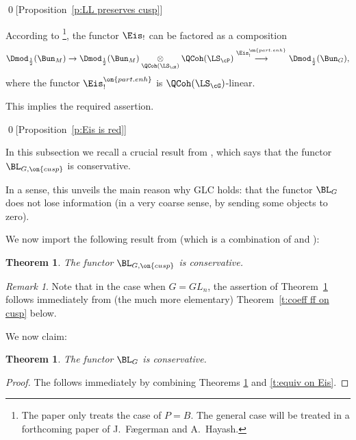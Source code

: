 \documentclass[9pt]{amsart}
\newtheorem{thm}[subsubsection]{Theorem}
\theoremstyle{remark}
\newtheorem{rem}[subsubsection]{Remark}
\theoremstyle{definition}
\theoremstyle{remark}
\newcommand{\thmref}[1]{Theorem~\ref{#1}}
\newcommand{\propref}[1]{Proposition~\ref{#1}}
\numberwithin{equation}{section}
\begin{document}
\qed[\propref{p:LL preserves cusp}] 


\sssec{Proof of \propref{p:Eis is red}} \label{sss:Eis is red} 

According to \cite{BG}\footnote{The paper \cite{BG} only treats the case of $P=B$. The general case will be treated
in a forthcoming paper of J.~F\ae{}german and A.~Hayash.}, the functor $\Eis_!$ can be factored as a composition
$$\Dmod_{\frac{1}{2}}(\Bun_M)\to
\Dmod_{\frac{1}{2}}(\Bun_M)\underset{\QCoh(\LS_\cM)}\otimes \QCoh(\LS_\cP) \overset{\Eis_!^{\on{part.enh}}}\longrightarrow 
\Dmod_{\frac{1}{2}}(\Bun_G),$$
where the functor $\Eis_!^{\on{part.enh}}$ is $\QCoh(\LS_\cG)$-linear.

\medskip

This implies the required assertion.

\qed[\propref{p:Eis is red}]


In this subsection we recall a crucial result from \cite{FR}, which says that the functor $\BL_{G,\on{cusp}}$
is conservative. 

\medskip

In a sense, this unveils the main reason why GLC holds: that the functor $\BL_G$ does not lose
information (in a very coarse sense, by sending some objects to zero). 

\sssec{} \label{sss:cons}

We now import the following result from \cite[Theorem A]{FR} (which is a combination of \cite[Theorem B]{FR}
and \cite[Theorem A]{Be2}):

\begin{thm} \label{t:cusp cons}
The functor $\BL_{G,\on{cusp}}$ is conservative.
\end{thm} 

\begin{rem}
Note that in the case when $G=GL_n$, the assertion of \thmref{t:cusp cons} follows immediately
from (the much more elementary) \thmref{t:coeff ff on cusp} below.
\end{rem}

\sssec{}

We now claim: 

\begin{thm} \label{t:L is cons}
The functor $\BL_G$ is conservative.
\end{thm}

\begin{proof}

The follows immediately by combining Theorems \ref{t:cusp cons} and \ref{t:equiv on Eis}. 

\end{proof}
\end{document}
